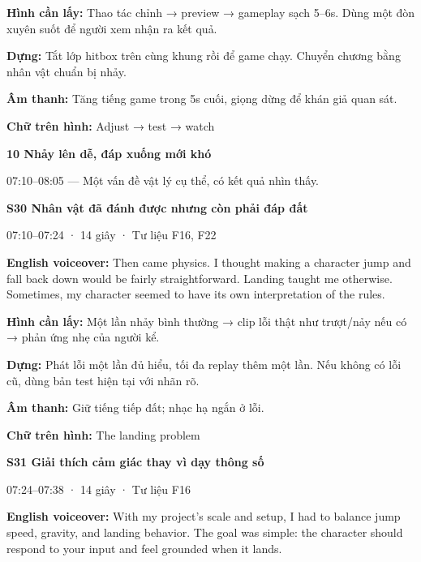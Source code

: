 \documentclass[10pt,a4paper]{article}
\begin{document}
\textbf{Hình cần lấy:}  Thao tác chỉnh → preview → gameplay sạch 5–6s. Dùng một đòn xuyên suốt để người xem nhận ra kết quả.\par

\textbf{Dựng:}  Tắt lớp hitbox trên cùng khung rồi để game chạy. Chuyển chương bằng nhân vật chuẩn bị nhảy.\par

\textbf{Âm thanh:}  Tăng tiếng game trong 5s cuối, giọng dừng để khán giả quan sát.\par

\textbf{Chữ trên hình:}  Adjust → test → watch\par

\textbf{10 Nhảy lên dễ, đáp xuống mới khó}\par

07:10–08:05 — Một vấn đề vật lý cụ thể, có kết quả nhìn thấy.\par

\textbf{S30 Nhân vật đã đánh được nhưng còn phải đáp đất}\par

07:10–07:24 · 14 giây · Tư liệu F16, F22\par

\textbf{English voiceover:}  Then came physics. I thought making a character jump and fall back down would be fairly straightforward. Landing taught me otherwise. Sometimes, my character seemed to have its own interpretation of the rules.\par

\textbf{Hình cần lấy:}  Một lần nhảy bình thường → clip lỗi thật như trượt/nảy nếu có → phản ứng nhẹ của người kể.\par

\textbf{Dựng:}  Phát lỗi một lần đủ hiểu, tối đa replay thêm một lần. Nếu không có lỗi cũ, dùng bản test hiện tại với nhãn rõ.\par

\textbf{Âm thanh:}  Giữ tiếng tiếp đất; nhạc hạ ngắn ở lỗi.\par

\textbf{Chữ trên hình:}  The landing problem\par

\textbf{S31 Giải thích cảm giác thay vì dạy thông số}\par

07:24–07:38 · 14 giây · Tư liệu F16\par

\textbf{English voiceover:}  With my project’s scale and setup, I had to balance jump speed, gravity, and landing behavior. The goal was simple: the character should respond to your input and feel grounded when it lands.\par
\end{document}
